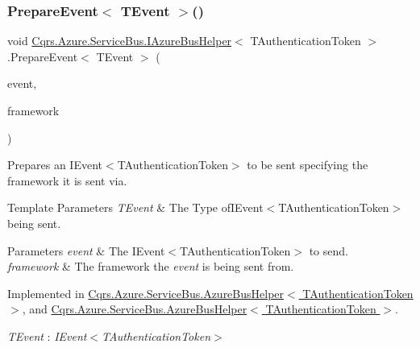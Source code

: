 \subsubsection{\texorpdfstring{Prepare\+Event$<$ T\+Event $>$()}{PrepareEvent< TEvent >()}}
{\footnotesize\ttfamily void \hyperlink{interfaceCqrs_1_1Azure_1_1ServiceBus_1_1IAzureBusHelper}{Cqrs.\+Azure.\+Service\+Bus.\+I\+Azure\+Bus\+Helper}$<$ T\+Authentication\+Token $>$.Prepare\+Event$<$ T\+Event $>$ (\begin{DoxyParamCaption}\item[{T\+Event @}]{event,  }\item[{string}]{framework }\end{DoxyParamCaption})}



Prepares an I\+Event$<$\+T\+Authentication\+Token$>$ to be sent specifying the framework it is sent via. 


\begin{DoxyTemplParams}{Template Parameters}
{\em T\+Event} & The Type ofI\+Event$<$\+T\+Authentication\+Token$>$ being sent.\\
\hline
\end{DoxyTemplParams}

\begin{DoxyParams}{Parameters}
{\em event} & The I\+Event$<$\+T\+Authentication\+Token$>$ to send.\\
\hline
{\em framework} & The framework the {\itshape event}  is being sent from.\\
\hline
\end{DoxyParams}


Implemented in \hyperlink{classCqrs_1_1Azure_1_1ServiceBus_1_1AzureBusHelper_afb3ade39a8f8fd39c871c687701d80f4_afb3ade39a8f8fd39c871c687701d80f4}{Cqrs.\+Azure.\+Service\+Bus.\+Azure\+Bus\+Helper$<$ T\+Authentication\+Token $>$}, and \hyperlink{classCqrs_1_1Azure_1_1ServiceBus_1_1AzureBusHelper_afb3ade39a8f8fd39c871c687701d80f4_afb3ade39a8f8fd39c871c687701d80f4}{Cqrs.\+Azure.\+Service\+Bus.\+Azure\+Bus\+Helper$<$ T\+Authentication\+Token $>$}.

\begin{Desc}
\item[Type Constraints]\begin{description}
\item[{\em T\+Event} : {\em I\+Event$<$T\+Authentication\+Token$>$}]\end{description}
\end{Desc}
\mbox{\label{interfaceCqrs_1_1Azure_1_1ServiceBus_1_1IAzureBusHelper_a16dd52eec62dd41df564bb25467b710d_a16dd52eec62dd41df564bb25467b710d}} 

